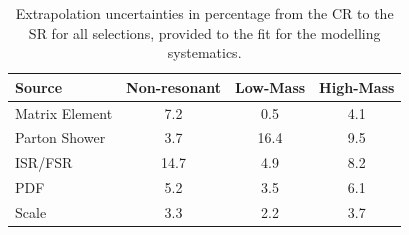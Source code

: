 \begin{table}
\centering
\begin{tabular}{l|ccc}
\hline
Source               & Non-resonant 	&  Low-Mass   		& 		High-Mass   \\\hline\hline 
Matrix Element       & 7.2 			&    0.5                	 &           	4.1                 \\\hline
Parton Shower        & 3.7 			&   16.4                     &              9.5                 \\\hline
ISR/FSR              & 14.7 			&  4.9       			 &             8.2                 \\\hline
PDF                  & 5.2 			&  3.5 			&           6.1                 \\\hline
Scale                & 3.3 			& 2.2                		&               3.7                 \\\hline\hline

\end{tabular}
\caption{Extrapolation uncertainties in percentage from the CR to the SR for all selections,  provided to the fit for the \ttbar modelling systematics.}
\label{tab:ttbarModeling}
\end{table}

